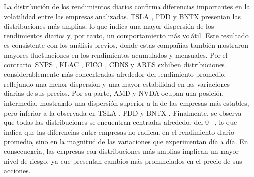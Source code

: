 La distribución de los rendimientos diarios confirma diferencias importantes en la volatilidad entre las empresas analizadas.
TSLA
,
PDD
y
BNTX
presentan las distribuciones más amplias, lo que indica una mayor dispersión de los rendimientos diarios y, por tanto, un comportamiento más volátil. Este resultado es consistente con los análisis previos, donde estas compañías también mostraron mayores fluctuaciones en los rendimientos acumulados y mensuales.
Por el contrario,
SNPS
,
KLAC
,
FICO
,
CDNS
y
ARES
exhiben distribuciones considerablemente más concentradas alrededor del rendimiento promedio, reflejando una menor dispersión y una mayor estabilidad en las variaciones diarias de sus precios. Por su parte,
AMD
y
NVDA
ocupan una posición intermedia, mostrando una dispersión superior a la de las empresas más estables, pero inferior a la observada en
TSLA
,
PDD
y
BNTX
.
Finalmente, se observa que todas las distribuciones se encuentran centradas alrededor del
0 %
, lo que indica que las diferencias entre empresas no radican en el rendimiento diario promedio, sino en la magnitud de las variaciones que experimentan día a día. En consecuencia, las empresas con distribuciones más amplias implican un mayor nivel de riesgo, ya que presentan cambios más pronunciados en el precio de sus acciones.